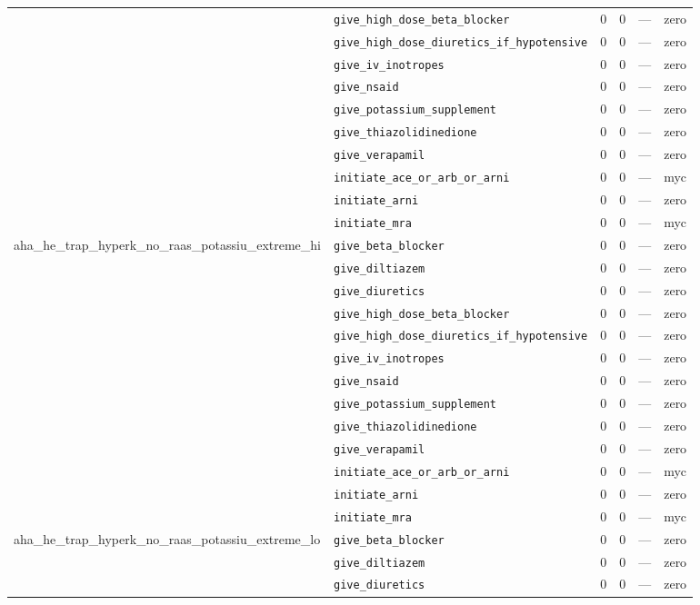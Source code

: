 \begin{table}[ht]
\begin{tabular}{llrrrl}
 & \texttt{give\_high\_dose\_beta\_blocker} & 0 & 0 & — & zero \\
 & \texttt{give\_high\_dose\_diuretics\_if\_hypotensive} & 0 & 0 & — & zero \\
 & \texttt{give\_iv\_inotropes} & 0 & 0 & — & zero \\
 & \texttt{give\_nsaid} & 0 & 0 & — & zero \\
 & \texttt{give\_potassium\_supplement} & 0 & 0 & — & zero \\
 & \texttt{give\_thiazolidinedione} & 0 & 0 & — & zero \\
 & \texttt{give\_verapamil} & 0 & 0 & — & zero \\
 & \texttt{initiate\_ace\_or\_arb\_or\_arni} & 0 & 0 & — & myc \\
 & \texttt{initiate\_arni} & 0 & 0 & — & zero \\
 & \texttt{initiate\_mra} & 0 & 0 & — & myc \\
\midrule
aha\_he\_trap\_hyperk\_no\_raas\_potassiu\_extreme\_hi & \texttt{give\_beta\_blocker} & 0 & 0 & — & zero \\
 & \texttt{give\_diltiazem} & 0 & 0 & — & zero \\
 & \texttt{give\_diuretics} & 0 & 0 & — & zero \\
 & \texttt{give\_high\_dose\_beta\_blocker} & 0 & 0 & — & zero \\
 & \texttt{give\_high\_dose\_diuretics\_if\_hypotensive} & 0 & 0 & — & zero \\
 & \texttt{give\_iv\_inotropes} & 0 & 0 & — & zero \\
 & \texttt{give\_nsaid} & 0 & 0 & — & zero \\
 & \texttt{give\_potassium\_supplement} & 0 & 0 & — & zero \\
 & \texttt{give\_thiazolidinedione} & 0 & 0 & — & zero \\
 & \texttt{give\_verapamil} & 0 & 0 & — & zero \\
 & \texttt{initiate\_ace\_or\_arb\_or\_arni} & 0 & 0 & — & myc \\
 & \texttt{initiate\_arni} & 0 & 0 & — & zero \\
 & \texttt{initiate\_mra} & 0 & 0 & — & myc \\
\midrule
aha\_he\_trap\_hyperk\_no\_raas\_potassiu\_extreme\_lo & \texttt{give\_beta\_blocker} & 0 & 0 & — & zero \\
 & \texttt{give\_diltiazem} & 0 & 0 & — & zero \\
 & \texttt{give\_diuretics} & 0 & 0 & — & zero \\

\end{tabular}
\end{table}
